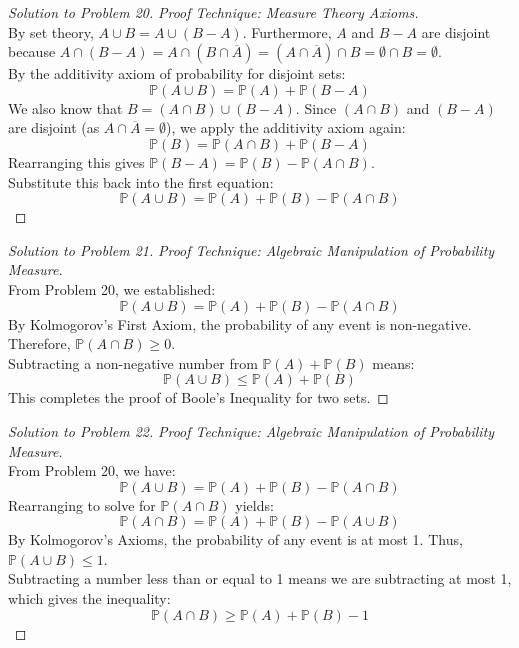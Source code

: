 \documentclass[12pt]{article}
\theoremstyle{definition}
\begin{document}
\begin{proof}[Solution to Problem 20]
\textit{Proof Technique: Measure Theory Axioms.} \\
By set theory, $A \cup B = A \cup (B - A)$. Furthermore, $A$ and $B - A$ are disjoint because $A \cap (B - A) = A \cap (B \cap \overline{A}) = (A \cap \overline{A}) \cap B = \emptyset \cap B = \emptyset$. \\
By the additivity axiom of probability for disjoint sets:
\[ \mathbb{P}(A \cup B) = \mathbb{P}(A) + \mathbb{P}(B - A) \]
We also know that $B = (A \cap B) \cup (B - A)$. Since $(A \cap B)$ and $(B - A)$ are disjoint (as $A \cap \overline{A} = \emptyset$), we apply the additivity axiom again:
\[ \mathbb{P}(B) = \mathbb{P}(A \cap B) + \mathbb{P}(B - A) \]
Rearranging this gives $\mathbb{P}(B - A) = \mathbb{P}(B) - \mathbb{P}(A \cap B)$. \\
Substitute this back into the first equation:
\[ \mathbb{P}(A \cup B) = \mathbb{P}(A) + \mathbb{P}(B) - \mathbb{P}(A \cap B) \]
\end{proof}

\begin{proof}[Solution to Problem 21]
\textit{Proof Technique: Algebraic Manipulation of Probability Measure.} \\
From Problem 20, we established:
\[ \mathbb{P}(A \cup B) = \mathbb{P}(A) + \mathbb{P}(B) - \mathbb{P}(A \cap B) \]
By Kolmogorov's First Axiom, the probability of any event is non-negative. Therefore, $\mathbb{P}(A \cap B) \ge 0$. \\
Subtracting a non-negative number from $\mathbb{P}(A) + \mathbb{P}(B)$ means:
\[ \mathbb{P}(A \cup B) \le \mathbb{P}(A) + \mathbb{P}(B) \]
This completes the proof of Boole's Inequality for two sets.
\end{proof}

\begin{proof}[Solution to Problem 22]
\textit{Proof Technique: Algebraic Manipulation of Probability Measure.} \\
From Problem 20, we have:
\[ \mathbb{P}(A \cup B) = \mathbb{P}(A) + \mathbb{P}(B) - \mathbb{P}(A \cap B) \]
Rearranging to solve for $\mathbb{P}(A \cap B)$ yields:
\[ \mathbb{P}(A \cap B) = \mathbb{P}(A) + \mathbb{P}(B) - \mathbb{P}(A \cup B) \]
By Kolmogorov's Axioms, the probability of any event is at most 1. Thus, $\mathbb{P}(A \cup B) \le 1$. \\
Subtracting a number less than or equal to 1 means we are subtracting at most 1, which gives the inequality:
\[ \mathbb{P}(A \cap B) \ge \mathbb{P}(A) + \mathbb{P}(B) - 1 \]
\end{proof}
\end{document}

